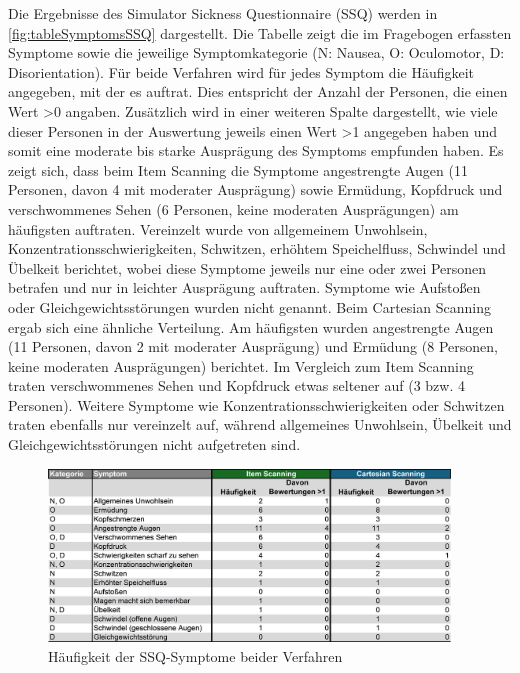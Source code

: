 Die Ergebnisse des Simulator Sickness Questionnaire (SSQ) werden in \autoref{fig:tableSymptomsSSQ} dargestellt. Die Tabelle zeigt die im Fragebogen erfassten Symptome sowie die jeweilige Symptomkategorie (N: Nausea, O: Oculomotor, D: Disorientation). Für beide Verfahren wird für jedes Symptom die Häufigkeit angegeben, mit der es auftrat. Dies entspricht der Anzahl der Personen, die einen Wert >0 angaben. Zusätzlich wird in einer weiteren Spalte dargestellt, wie viele dieser Personen in der Auswertung jeweils einen Wert >1 angegeben haben und somit eine moderate bis starke Ausprägung des Symptoms empfunden haben. 
Es zeigt sich, dass beim Item Scanning die Symptome angestrengte Augen (11 Personen, davon 4 mit moderater Ausprägung) sowie Ermüdung, Kopfdruck und verschwommenes Sehen (6 Personen, keine moderaten Ausprägungen) am häufigsten auftraten. Vereinzelt wurde von allgemeinem Unwohlsein, Konzentrationsschwierigkeiten, Schwitzen, erhöhtem Speichelfluss, Schwindel und Übelkeit berichtet, wobei diese Symptome jeweils nur eine oder zwei Personen betrafen und nur in leichter Ausprägung auftraten. Symptome wie Aufstoßen oder Gleichgewichtsstörungen wurden nicht genannt.
Beim Cartesian Scanning ergab sich eine ähnliche Verteilung. Am häufigsten wurden angestrengte Augen (11 Personen, davon 2 mit moderater Ausprägung) und Ermüdung (8 Personen, keine moderaten Ausprägungen) berichtet. Im Vergleich zum Item Scanning traten verschwommenes Sehen und Kopfdruck etwas seltener auf (3 bzw. 4 Personen). Weitere Symptome wie Konzentrationsschwierigkeiten oder Schwitzen traten ebenfalls nur vereinzelt auf, während allgemeines Unwohlsein, Übelkeit und Gleichgewichtsstörungen nicht aufgetreten sind.

\begin{figure}[tbh]
    \centering
    \includegraphics[width=0.95\textwidth]{images/Results/SSQ-Table-2.png}
    \caption{Häufigkeit der SSQ-Symptome beider Verfahren }
    \label{fig:tableSymptomsSSQ}
\end{figure}

